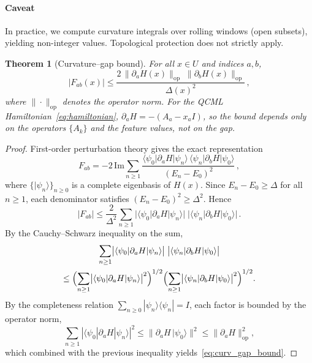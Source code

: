 \documentclass[3p]{elsarticle}
\newtheorem{theorem}{Theorem}
\newcommand{\ket}[1]{|#1\rangle}
\newcommand{\bra}[1]{\langle#1|}
\newcommand{\dbraket}[3]{\langle#1|#2|#3\rangle}
\begin{document}
\paragraph{Caveat}  In practice, we compute curvature integrals over
rolling windows (open subsets), yielding non-integer values.
Topological protection does not strictly apply.

\begin{theorem}[Curvature--gap bound]\label{thm:curvature_gap}
For all $x \in U$ and indices $a, b$,
\begin{equation}\label{eq:curv_gap_bound}
  |F_{ab}(x)| \leq
  \frac{2\,\|\partial_a H(x)\|_{\mathrm{op}}\;\|\partial_b H(x)\|_{\mathrm{op}}}
       {\Delta(x)^2}\,,
\end{equation}
where $\|\cdot\|_{\mathrm{op}}$ denotes the operator norm.
For the QCML Hamiltonian~\eqref{eq:hamiltonian},
$\partial_a H = -(A_a - x_a I)$, so the bound depends only on
the operators $\{A_k\}$ and the feature values, not on the gap.
\end{theorem}
\begin{proof}
First-order perturbation theory gives the exact representation
\begin{equation}\label{eq:berry_perturbation}
  F_{ab} = -2\,\mathrm{Im}\sum_{n \geq 1}
  \frac{\dbraket{\psi_0}{\partial_a H}{\psi_n}\,
        \dbraket{\psi_n}{\partial_b H}{\psi_0}}
       {(E_n - E_0)^2}\,,
\end{equation}
where $\{\ket{\psi_n}\}_{n \geq 0}$ is a complete eigenbasis of
$H(x)$.  Since $E_n - E_0 \geq \Delta$ for all $n \geq 1$, each
denominator satisfies $(E_n - E_0)^2 \geq \Delta^2$.  Hence
\[
  |F_{ab}|
  \leq \frac{2}{\Delta^2}\sum_{n \geq 1}
  \bigl|\dbraket{\psi_0}{\partial_a H}{\psi_n}\bigr|\;
  \bigl|\dbraket{\psi_n}{\partial_b H}{\psi_0}\bigr|\,.
\]
By the Cauchy--Schwarz inequality on the sum,
\begin{multline*}
  \sum_{n \geq 1}
  \bigl|\dbraket{\psi_0}{\partial_a H}{\psi_n}\bigr|\;
  \bigl|\dbraket{\psi_n}{\partial_b H}{\psi_0}\bigr| \\
  \leq
  \Bigl(\sum_{n \geq 1}
  \bigl|\dbraket{\psi_0}{\partial_a H}{\psi_n}\bigr|^2\Bigr)^{1/2}
  \Bigl(\sum_{n \geq 1}
  \bigl|\dbraket{\psi_n}{\partial_b H}{\psi_0}\bigr|^2\Bigr)^{1/2}.
\end{multline*}
By the completeness relation
$\sum_{n \geq 0}\ket{\psi_n}\bra{\psi_n} = I$, each factor is
bounded by the operator norm,
\[
  \sum_{n \geq 1}|\dbraket{\psi_0}{\partial_a H}{\psi_n}|^2
  \leq \|\partial_a H\,\ket{\psi_0}\|^2
  \leq \|\partial_a H\|_{\mathrm{op}}^2,
\]
which combined with the previous inequality yields~\eqref{eq:curv_gap_bound}.
\end{proof}
\end{document}
